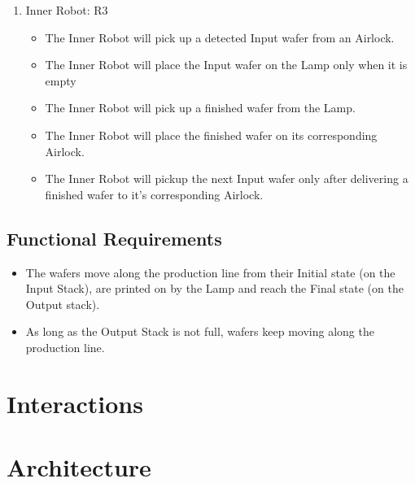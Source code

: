 \documentclass[a4paper,12pt]{article}
\begin{document}
\begin{enumerate}
\item Inner Robot: R3
	\begin{itemize}
	\item The Inner Robot will pick up a detected Input wafer from an Airlock.
	\item The Inner Robot will place the Input wafer on the Lamp only when it is empty
	\item The Inner Robot will pick up a finished wafer from the Lamp.
	\item The Inner Robot will place the finished wafer on its corresponding Airlock.
	\item The Inner Robot will pickup the next Input wafer only after delivering a finished wafer to it's corresponding Airlock.
	\end{itemize}

\end{enumerate}
\subsection{Functional Requirements}
\begin{itemize}
\item The wafers move along the production line from their Initial state (on the Input Stack), are printed on by the Lamp and reach the Final state (on the Output stack).
\item As long as the Output Stack is not full, wafers keep moving along the production line.
\end{itemize}



\section{Interactions} 

\section{Architecture}
\end{document}
